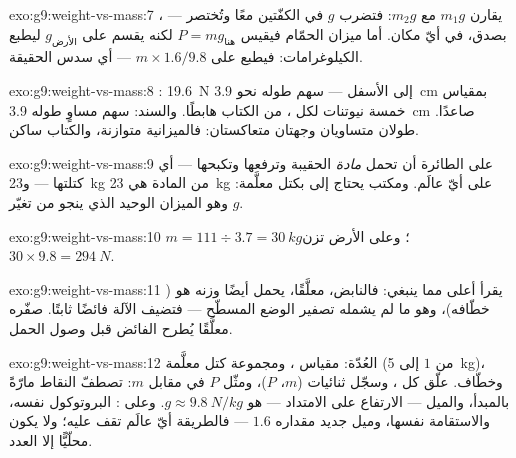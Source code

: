 \begin{solution}{exo:g9:weight-vs-mass:7}
 يقارن $m_1 g$ مع $m_2 g$: فتضرب $g$ في الكفّتين
معًا وتُختصر --- ، بصدق، في أيّ مكان. أما ميزان الحمّام
فيقيس $P = m g_{\text{هنا}}$ لكنه يقسم على $g_{\text{الأرض}}$
ليطبع الكيلوغرامات: فيطبع على  $m \times 1.6/9.8$ --- أي
سدس الحقيقة.
\end{solution}

\begin{solution}{exo:g9:weight-vs-mass:8}
: \qty{19.6}{N} إلى الأسفل --- سهم طوله نحو \qty{3.9}{cm}
بمقياس خمسة نيوتنات لكل ، من الكتاب هابطًا. والسند: سهم
مساوٍ طوله \qty{3.9}{cm} صاعدًا. طولان متساويان وجهتان
متعاكستان: فالميزانية متوازنة، والكتاب ساكن.
\end{solution}

\begin{solution}{exo:g9:weight-vs-mass:9}
على الطائرة أن تحمل \emph{مادة} الحقيبة وترفعها وتكبحها ---
أي كتلتها --- و\qty{23}{kg} من المادة هي \qty{23}{kg} على أيّ
عالَم. ومكتب  يحتاج إلى  بكتل معلَّمة: وهو
الميزان الوحيد الذي ينجو من تغيّر $g$.
\end{solution}

\begin{solution}{exo:g9:weight-vs-mass:10}
$m = 111 \div 3.7 = \qty{30}{kg}$؛ وعلى الأرض تزن $30 \times
9.8 = \qty{294}{N}$.
\end{solution}

\begin{solution}{exo:g9:weight-vs-mass:11}
يقرأ أعلى مما ينبغي: فالنابض، معلَّقًا، يحمل أيضًا وزنه هو
( خطّافه)، وهو ما لم يشمله تصفير الوضع المسطّح --- فتضيف
الآلة فائضًا ثابتًا. صفّره معلَّقًا يُطرح الفائض قبل وصول
الحمل.
\end{solution}

\begin{solution}{exo:g9:weight-vs-mass:12}
العُدّة: مقياس ، ومجموعة كتل معلَّمة (من $1$ إلى
\qty{5}{kg})، وخطّاف. علّق كل ، وسجّل ثنائيات ($m$، $P$)،
ومثّل $P$ في مقابل $m$: تصطفّ النقاط مارّةً بالمبدأ، والميل
--- الارتفاع  على الامتداد  --- هو
$g \approx \qty{9.8}{N/kg}$. وعلى : البروتوكول نفسه،
والاستقامة نفسها، وميل جديد مقداره $1.6$ --- فالطريقة 
أيّ عالَم تقف عليه؛ ولا يكون محلّيًّا إلا العدد.
\end{solution}

